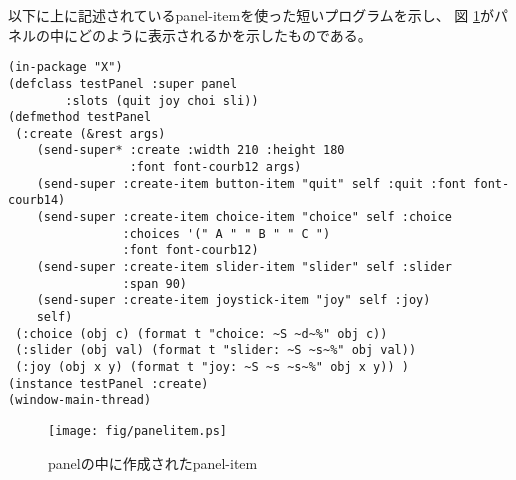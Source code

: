 \begin{refdesc}


\end{refdesc}

以下に上に記述されているpanel-itemを使った短いプログラムを示し、
図 \ref{panelitem}がパネルの中にどのように表示されるかを示したものである。

\begin{verbatim}
(in-package "X")
(defclass testPanel :super panel
        :slots (quit joy choi sli))
(defmethod testPanel
 (:create (&rest args)
    (send-super* :create :width 210 :height 180 
                 :font font-courb12 args)
    (send-super :create-item button-item "quit" self :quit :font font-courb14)
    (send-super :create-item choice-item "choice" self :choice
                :choices '(" A " " B " " C ")
                :font font-courb12)
    (send-super :create-item slider-item "slider" self :slider
                :span 90)
    (send-super :create-item joystick-item "joy" self :joy)
    self)
 (:choice (obj c) (format t "choice: ~S ~d~%" obj c))
 (:slider (obj val) (format t "slider: ~S ~s~%" obj val))
 (:joy (obj x y) (format t "joy: ~S ~s ~s~%" obj x y)) )
(instance testPanel :create)
(window-main-thread)
\end{verbatim}

\begin{figure}
\begin{center}
\texttt{[image: fig/panelitem.ps]}
\end{center}
\caption{panelの中に作成されたpanel-item\label{panelitem}}
\end{figure}

